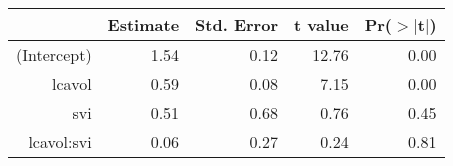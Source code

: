 \begin{table}[ht]
\centering
\begin{tabular}{rrrrr}
  \hline
 & Estimate & Std. Error & t value & Pr($>$$|$t$|$) \\ 
  \hline
(Intercept) & 1.54 & 0.12 & 12.76 & 0.00 \\ 
  lcavol & 0.59 & 0.08 & 7.15 & 0.00 \\ 
  svi & 0.51 & 0.68 & 0.76 & 0.45 \\ 
  lcavol:svi & 0.06 & 0.27 & 0.24 & 0.81 \\ 
   \hline
\end{tabular}
\end{table}
